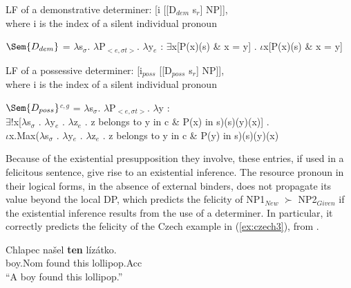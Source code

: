 \documentclass[output=paper,modfonts,nonflat]{langsci/langscibook}
\begin{document}
\ea LF of a demonstrative determiner:
[i [[D$_{dem}$ s$_{r}$] NP]],\\
where i is the index of a silent individual pronoun
\z

\ea
$\Sem{D_{dem}}$ = $\lambda$s$_{\sigma}$. $\lambda$P$_{<e,\sigma t>}$. $\lambda$y$_{e}$ : $\exists$x[P(x)(s) \& x = y] . $\iota$x[P(x)(s) \& x = y] \label{definition:demonstrative}
\z


\ea LF of a possessive determiner:
[i$_{poss}$ [[D$_{poss}$ s$_{r}$] NP]],\\
where i is the index of a silent individual pronoun
\z

\ea
$\Sem{D_{poss}}$$^{c,g}$ = $\lambda$s$_{\sigma}$. $\lambda$P$_{<e,\sigma t>}$. $\lambda$y : \label{definition:possessive}\\
$\exists$!x[$\lambda$s$_{\sigma}$ . $\lambda$y$_{e}$ . $\lambda$z$_{e}$ .  z belongs to y in c \& P(x) in s)(s)(y)(x)] .\\
$\iota$x.Max($\lambda$s$_{\sigma}$ . $\lambda$y$_{e}$ . $\lambda$z$_{e}$ . z belongs to y in c \& P(y) in s)(s)(y)(x)
\z

Because of the existential presupposition they involve, these entries, if used in a felicitous sentence, give rise to an existential inference. The resource pronoun in their logical forms, in the absence of external binders, does not propagate its value beyond the local DP, which predicts the felicity of NP1$_{New}$ $\succ$ NP2$_{Given}$ if the existential inference results from the use of a determiner. In particular, it correctly predicts the felicity of the Czech example in (\ref{ex:czech3}), from \citet{Kucerova:2012}.

\ea \label{ex:czech3} 
\gll Chlapec na\v{s}el {\bf ten} l\'{i}z\'{a}tko.\\
boy.Nom found this lollipop.Acc\\
\glt ``A boy found this lollipop.''
\z


\end{document}
